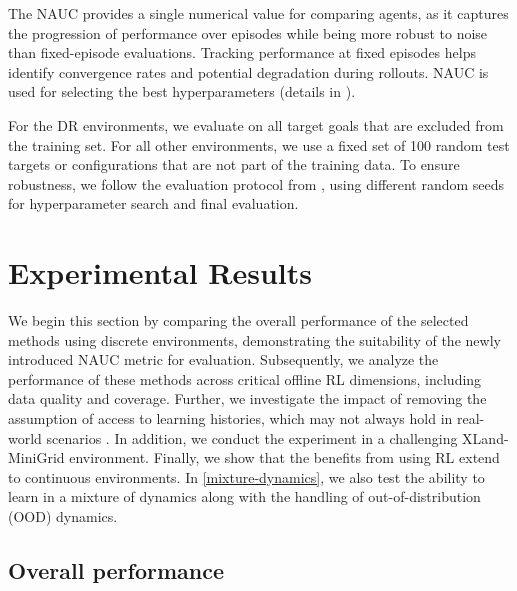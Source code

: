 \documentclass{article} %
\begin{document}
The NAUC provides a single numerical value for comparing agents, as it captures the progression of performance over episodes while being more robust to noise than fixed-episode evaluations. Tracking performance at fixed episodes helps identify convergence rates and potential degradation during rollouts. NAUC is used for selecting the best hyperparameters (details in ).

For the DR environments, we evaluate on all target goals that are excluded from the training set. For all other environments, we use a fixed set of 100 random test targets or configurations that are not part of the training data. To ensure robustness, we follow the evaluation protocol from \citet{tarasov2024revisiting}, using different random seeds for hyperparameter search and final evaluation.

\section{Experimental Results}
We begin this section by comparing the overall performance of the selected methods using discrete environments, demonstrating the suitability of the newly introduced NAUC metric for evaluation. Subsequently, we analyze the performance of these methods across critical offline RL dimensions, including data quality and coverage. Further, we investigate the impact of removing the assumption of access to learning histories, which may not always hold in real-world scenarios \citep{zisman2023emergence}. In addition, we conduct the experiment in a challenging XLand-MiniGrid \citep{nikulin2023xland} environment. Finally, we show that the benefits from using RL extend to continuous environments. In \autoref{mixture-dynamics}, we also test the ability to learn in a mixture of dynamics along with the handling of out-of-distribution (OOD) dynamics.
\subsection{Overall performance}
\end{document}
